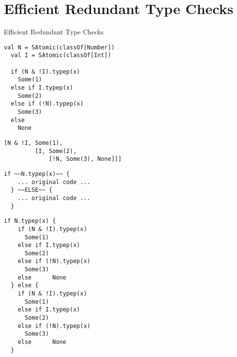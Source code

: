 \section{Efficient Redundant Type Checks}

\begin{frame}{Efficient Redundant Type Checks}
\end{frame}


\newsavebox\typecaseAbox
\begin{lrbox}{\typecaseAbox}
  \begin{minipage}{8cm}
\begin{lstlisting}[style=scalaioScala]
  val N = SAtomic(classOf[Number])
  val I = SAtomic(classOf[Int])

  if (N & !I).typep(x)
    Some(1)
  else if I.typep(x)
    Some(2)
  else if (!N).typep(x)
    Some(3)
  else
    None
\end{lstlisting}
  \end{minipage}
\end{lrbox}

\newsavebox\typecaseITEbox
\begin{lrbox}{\typecaseITEbox}
  \begin{minipage}{8cm}
\begin{lstlisting}[style=scalaioScala]
[N & !I, Some(1),
         [I, Some(2),
             [!N, Some(3), None]]]
\end{lstlisting}
  \end{minipage}
\end{lrbox}

\newsavebox\typecaseBabox
\begin{lrbox}{\typecaseBabox}
  \begin{minipage}{8cm}
\begin{lstlisting}[style=scalaioScala]
  if ~~N.typep(x)~~ {
    ... original code ...
  } ~~ELSE~~ {
    ... original code ...
  }
\end{lstlisting}
  \end{minipage}
\end{lrbox}

\newsavebox\typecaseBbox
\begin{lrbox}{\typecaseBbox}
  \begin{minipage}{8cm}
\begin{lstlisting}[style=scalaioScala]
  if N.typep(x) {
    if (N & !I).typep(x)
      Some(1)
    else if I.typep(x)
      Some(2)
    else if (!N).typep(x)
      Some(3)
    else      None
  } else {
    if (N & !I).typep(x)
      Some(1)
    else if I.typep(x)
      Some(2)
    else if (!N).typep(x)
      Some(3)
    else      None
  }
\end{lstlisting}
  \end{minipage}
\end{lrbox}



